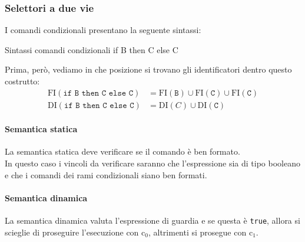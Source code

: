 \subsubsection{Selettori a due vie}
I comandi condizionali presentano la seguente sintassi:
\begin{bnfcode}{Sintassi comandi condizionali}
    if B then C else C
\end{bnfcode}

Prima, però, vediamo in che posizione si trovano gli identificatori dentro questo costrutto:
\[
    \begin{aligned}
        \mathrm{FI}(\texttt{if B then C else C}) &= \mathrm{FI}(\texttt{B}) \cup \mathrm{FI}(\texttt{C}) \cup \mathrm{FI}(\texttt{C})\\
        \mathrm{DI}(\texttt{if B then C else C}) &= \mathrm{DI}(C) \cup \mathrm{DI}(\texttt{C})
    \end{aligned}
\]

\paragraph{Semantica statica}
La semantica statica deve verificare se il comando è ben formato.\\[0.2ex]
In questo caso i vincoli da verificare saranno che l'espressione sia di tipo booleano e che i comandi dei rami condizionali siano ben formati.



\paragraph{Semantica dinamica}
La semantica dinamica valuta l'espressione di guardia e se questa è \texttt{true}, allora si scieglie di proseguire l'esecuzione con $\mathrm{c}_0$, altrimenti si prosegue con $\mathrm{c}_1$.


